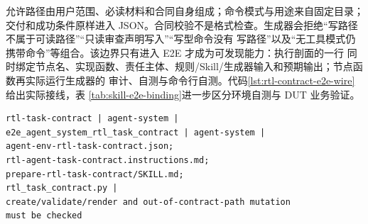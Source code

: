 \documentclass[UTF8,a4paper,zihao=-4,oneside]{ctexart}
\begin{document}
允许路径由用户范围、必读材料和合同自身组成；命令模式与用途来自固定目录；交付和成功条件原样进入
JSON。合同校验不是格式检查。生成器会拒绝“写路径不属于可读路径”“只读审查声明写入”“写型命令没有
写路径”以及“无工具模式仍携带命令”等组合。该边界只有进入 E2E 才成为可发现能力：执行剖面的一行
同时绑定节点名、实现函数、责任主体、规则/Skill/生成器输入和预期输出；节点函数再实际运行生成器的
审计、自测与命令行自测。代码\ref{lst:rtl-contract-e2e-wire}给出实际接线，表
\ref{tab:skill-e2e-binding}进一步区分环境自测与 DUT 业务验证。

\begin{lstlisting}[language={},numbers=none,
  caption={合同能力在 E2E 任务图中的真实接线（换行仅为排版）},
  label={lst:rtl-contract-e2e-wire}]
rtl-task-contract | agent-system |
e2e_agent_system_rtl_task_contract | agent-system |
agent-env-rtl-task-contract.json;
rtl-agent-task-contract.instructions.md;
prepare-rtl-task-contract/SKILL.md;
rtl_task_contract.py |
create/validate/render and out-of-contract-path mutation
must be checked
\end{lstlisting}

\newcommand{\TableSkillEndToEndBinding}{%
\begin{table}[H]
  \centering
  \small
  \caption{同一 RV64 合同能力在 Skill 与 E2E 中的接线}
  \label{tab:skill-e2e-binding}
  \begin{tabularx}{\linewidth}{@{}L{0.20\linewidth}L{0.35\linewidth}Y@{}}
    \toprule
    接线位置 & 实际绑定对象 & 可检验结果 \\
    \midrule
    \texttt{SKILL.md} & 能力分档、最小上下文、canonical 调用次序、未知项和范围扩展出口 & Agent 对同类任务遵循同一操作规约；不把口头追加当作新权限 \\
    合同生成器 & instruction、策略 JSON、schema 与 \texttt{create/validate/render} 入口 & 合同可生成；越权组合被校验器拒绝；提示绑定合同哈希 \\
    E2E profile & 节点 \texttt{rtl-task-contract}、实现函数、责任主体，以及规则/Skill/生成器输入 & 该能力能够被任务图发现并调度，而非孤立脚本 \\
    E2E 节点函数 & 生成器审计、自测、命令行自测和合同外路径 mutation & 正向用法可运行，目标越权变体会产生非零结果与独立日志 \\
    业务验证 & 合同列出的 RTL testbench、DiffTest、综合、STA 或 PPA gate & 决定被测设计是否合格；不由 Skill/E2E 的环境自测代替 \\
    \bottomrule
  \end{tabularx}
\end{table}
}%
\end{document}
